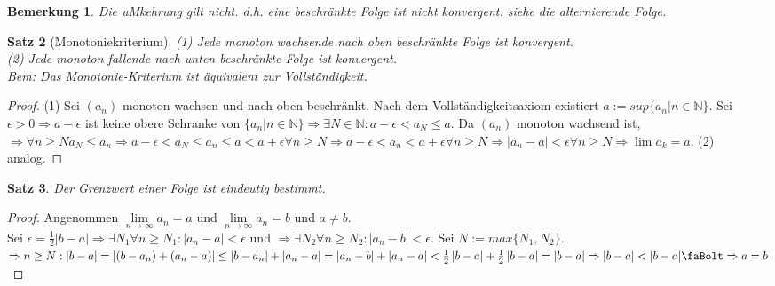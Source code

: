 \documentclass[a4paper,titlepage,oneside]{article}
\def\N{\ensuremath{\mathbb{N}} }
\def\WSP{\text{\faBolt}}
\def\toinf{\ensuremath{\rightarrow \infty}}
\theoremstyle{thmstyle}
\newtheorem{satz}{Satz}[subsection]
\newtheorem{bem}[satz]{Bemerkung}
\begin{document}
\begin{bem}
Die uMkehrung gilt nicht. d.h. eine beschränkte Folge ist nicht konvergent. siehe die alternierende Folge.
\end{bem}


\begin{satz}[Monotoniekriterium]
(1) Jede monoton wachsende nach oben beschränkte Folge ist konvergent.\\
(2) Jede monoton fallende nach unten beschränkte Folge ist konvergent.\\
Bem: Das Monotonie-Kriterium ist äquivalent zur Vollständigkeit.
\end{satz}
\begin{proof}
(1) Sei $(a_n)$ monoton wachsen und nach oben beschränkt. Nach dem Vollständigkeitsaxiom existiert $a := sup\{a_n | n \in \N\}$.
Sei $\epsilon > 0 \Rightarrow a - \epsilon$ ist keine obere Schranke von $\{a_n | n \in \N\} \Rightarrow \exists N \in \N : a-\epsilon < a_N \le a$. Da $(a_n)$ monoton wachsend ist, $ \Rightarrow \forall n \ge N a_N \le a_n \Rightarrow a-\epsilon < a_N \le a_n \le a < a+\epsilon \forall n \ge N \Rightarrow
a-\epsilon < a_n < a+\epsilon \forall n \ge N \Rightarrow |a_n - a| < \epsilon \forall n \ge N \Rightarrow \lim{a_k} = a.$
(2) analog.
\end{proof}

\begin{satz}
Der Grenzwert einer Folge ist eindeutig bestimmt.
\end{satz}
\begin{proof}
Angenommen $\lim\limits_{n \toinf}{a_n} = a$ und $\lim\limits_{n \toinf}{a_n} = b$ und $ a \ne b$.\\
Sei $\epsilon = \frac{1}{2}\left|b-a\right| \Rightarrow \exists N_1 \forall n \ge N_1 : |a_n - a| < \epsilon$ und $\Rightarrow \exists N_2 \forall n \ge N_2 : |a_n - b| < \epsilon$. Sei $N := max\{N_1, N_2\}$.\\
$\Rightarrow n \ge N : |b-a| = |(b-a_n) + (a_n - a)| \le |b - a_n| + |a_n - a| = |a_n - b| + |a_n - a| < \frac{1}{2}\left|b-a\right| + \frac{1}{2}\left|b-a\right| = |b-a|  \Rightarrow |b-a|  < |b-a| \WSP \Rightarrow a = b$
\end{proof}
\end{document}

